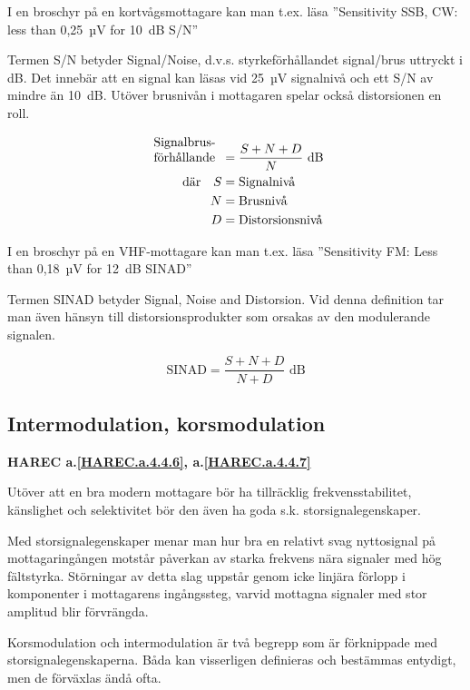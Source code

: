 I en broschyr på en kortvågsmottagare kan man t.ex. läsa
''Sensitivity SSB, CW: less than 0,25~µV for 10~dB S/N''

Termen S/N betyder Signal/Noise, d.v.s. styrkeförhållandet signal/brus
uttryckt i dB. Det innebär att en signal kan läsas vid 25~µV signalnivå
och ett S/N av mindre än 10~dB.
Utöver brusnivån i mottagaren spelar också distorsionen en roll.

\begin{align*}
  \begin{array}[b]{l}
    \text{Signalbrus-} \\
    \text{förhållande}
  \end{array} &= \frac{S + N + D}{N} \text{ dB} \\
  \text{där} \quad S &= \text{Signalnivå} \\
  N &= \text{Brusnivå} \\
  D &= \text{Distorsionsnivå} \\
\end{align*}

I en broschyr på en VHF-mottagare kan man t.ex. läsa
''Sensitivity FM: Less than 0,18~µV for 12~dB SINAD''

Termen SINAD betyder Signal, Noise and Distorsion. Vid denna
definition tar man även hänsyn till distorsionsprodukter som orsakas
av den modulerande signalen.

\[
\text{SINAD} = \frac{S+N+D}{N+D}\text{ dB}
\]

\subsection{Intermodulation, korsmodulation}
\textbf{HAREC
  a.\ref{HAREC.a.4.4.6}\label{myHAREC.a.4.4.6},
  a.\ref{HAREC.a.4.4.7}\label{myHAREC.a.4.4.7}
}

Utöver att en bra modern mottagare bör ha tillräcklig
frekvensstabilitet, känslighet och selektivitet bör den även ha goda
s.k. storsignalegenskaper.

Med storsignalegenskaper menar man hur bra en relativt svag
nyttosignal på mottagaringången motstår påverkan av starka
frekvens nära signaler med hög fältstyrka. Störningar av detta slag
uppstår genom icke linjära förlopp i komponenter i mottagarens
ingångssteg, varvid mottagna signaler med stor amplitud blir
förvrängda.

Korsmodulation och intermodulation är två begrepp som är förknippade
med storsignalegenskaperna. Båda kan visserligen definieras och
bestämmas entydigt, men de förväxlas ändå ofta.

